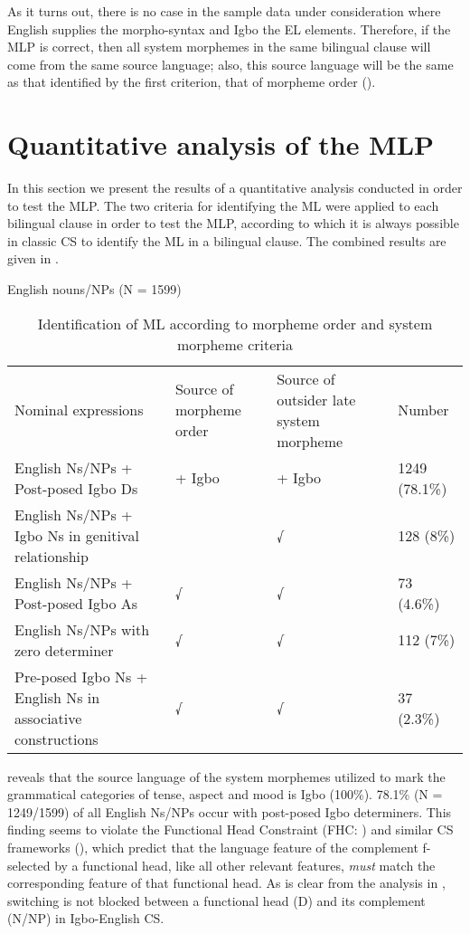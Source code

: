 \documentclass[output=paper]{langsci/langscibook}
\begin{document}
As it turns out, there is no case in the sample data under consideration where English supplies the morpho-syntax and Igbo the EL elements. Therefore, if the MLP is correct, then all system morphemes in the same bilingual clause will come from the same source language; also, this source language will be the same as that identified by the first criterion, that of morpheme order ().

\section{Quantitative analysis of the MLP}

In this section we present the results of a quantitative analysis conducted in order to test the MLP. The two criteria for identifying the ML were applied to each bilingual clause in order to test the MLP, according to which it is always possible in classic CS to identify the ML in a bilingual clause. The combined results are given in . 
 
\begin{table}
\caption{English nouns/NPs (N = 1599)}

\begin{tabularx}{\textwidth}{XXXX}
Nominal expressions                                             & Source of morpheme order & Source of outsider late system morpheme & Number \\
English Ns/NPs + Post-posed Igbo Ds                             & + Igbo   &   + Igbo & 1249 (78.1\%) \\
English Ns/NPs + Igbo Ns in genitival relationship             &          &    √       & 128 (8\%)     \\
English Ns/NPs + Post-posed Igbo As                            &  √      &     √      &  73 (4.6\%)   \\
English Ns/NPs with zero determiner                            &  √     &      √      &  112 (7\%)   \\
Pre-posed Igbo Ns + English Ns in associative constructions   &   √    &       √      & 37 (2.3\%)   \\
\end{tabularx}
     
\caption{Identification of ML according to morpheme order and system morpheme criteria}
\label{tab:2}
\end{table} 

 reveals that the source language of the system morphemes utilized to mark the grammatical categories of tense, aspect and mood is Igbo (100\%). 78.1\% (N = 1249/1599) of all English Ns/NPs occur with post-posed Igbo determiners. This finding seems to violate the Functional Head Constraint (FHC: \citealt{BelaziEtAl1994}) and similar CS frameworks (), which predict that the language feature of the complement f-selected by a functional head, like all other relevant features, \textit{must} match the corresponding feature of that functional head. As is clear from the analysis in , switching is not blocked between a functional head (D) and its complement (N/NP) in Igbo-English CS. 
\end{document}
